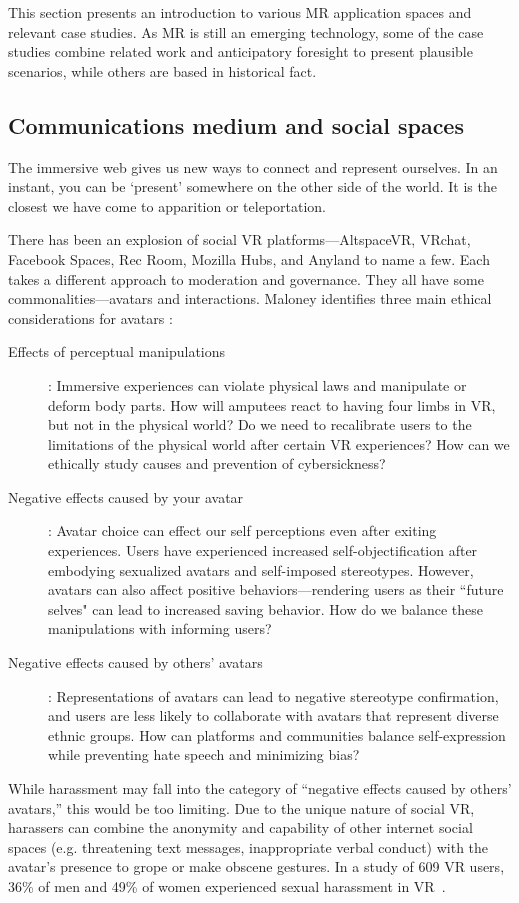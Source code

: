 This section presents an introduction to various MR application spaces and relevant case studies. As MR is still an emerging technology, some of the case studies combine related work and anticipatory foresight to present plausible scenarios, while others are based in historical fact.

\subsection{Communications medium and social spaces} \label{subsec:communications}
The immersive web gives us new ways to connect and represent ourselves. In an instant, you can be `present' somewhere on the other side of the world. It is the closest we have come to apparition or teleportation.

There has been an explosion of social VR platforms---AltspaceVR, VRchat, Facebook Spaces, Rec Room, Mozilla Hubs, and Anyland to name a few. Each takes a different approach to moderation and governance. They all have some commonalities---avatars and interactions. Maloney identifies three main ethical considerations for avatars \cite{maloney}:
\begin{description}
	\item[ Effects of perceptual manipulations]: Immersive experiences can violate physical laws and manipulate or deform body parts. How will amputees react to having four limbs in VR, but not in the physical world? Do we need to recalibrate users to the limitations of the physical world after certain VR experiences? How can we ethically study causes and prevention of cybersickness?
	\item [Negative effects caused by your avatar]: Avatar choice can effect our self perceptions even after exiting experiences. Users have experienced increased self-objectification after embodying sexualized avatars and self-imposed stereotypes. However, avatars can also affect positive behaviors---rendering users as their ``future selves" can lead to increased saving behavior. How do we balance these manipulations with informing users?
	\item [Negative effects caused by others' avatars]: Representations of avatars can lead to negative stereotype confirmation, and users are less likely to collaborate with avatars that represent diverse ethnic groups. How can platforms and communities balance self-expression while preventing hate speech and minimizing bias?
\end{description}

While harassment may fall into the category of ``negative effects caused by others' avatars,'' this would be too limiting. Due to the unique nature of social VR, harassers can combine the anonymity and capability of other internet social spaces (e.g. threatening text messages, inappropriate verbal conduct) with the avatar's presence to grope or make obscene gestures. In a study of 609 VR users, 36\% of men and 49\% of women experienced sexual harassment in VR~\cite{outlaw2018}.

